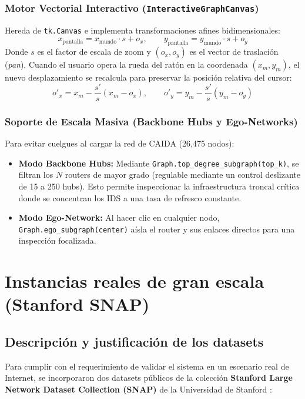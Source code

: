 \documentclass[11pt,a4paper]{article}
\begin{document}
\subsubsection{Motor Vectorial Interactivo (\texttt{InteractiveGraphCanvas})}
Hereda de \texttt{tk.Canvas} e implementa transformaciones afines bidimensionales:
\begin{equation}
	x_{\text{pantalla}} = x_{\text{mundo}} \cdot s + o_x, \qquad y_{\text{pantalla}} = y_{\text{mundo}} \cdot s + o_y
\end{equation}
Donde $s$ es el factor de escala de zoom y $(o_x, o_y)$ es el vector de traslación (\textit{pan}). Cuando el usuario opera la rueda del ratón en la coordenada $(x_m, y_m)$, el nuevo desplazamiento se recalcula para preservar la posición relativa del cursor:
\begin{equation}
	o'_x = x_m - \frac{s'}{s} (x_m - o_x), \qquad o'_y = y_m - \frac{s'}{s} (y_m - o_y)
\end{equation}

\subsubsection{Soporte de Escala Masiva (Backbone Hubs y Ego-Networks)}
Para evitar cuelgues al cargar la red de CAIDA (26,475 nodos):
\begin{itemize}[itemsep=1pt]
	\item \textbf{Modo Backbone Hubs:} Mediante \texttt{Graph.top\_degree\_subgraph(top\_k)}, se filtran los $N$ routers de mayor grado (regulable mediante un control deslizante de 15 a 250 hubs). Esto permite inspeccionar la infraestructura troncal crítica donde se concentran los IDS a una tasa de refresco constante.
	\item \textbf{Modo Ego-Network:} Al hacer clic en cualquier nodo, \texttt{Graph.ego\_subgraph(center)} aísla el router y sus enlaces directos para una inspección focalizada.
\end{itemize}

\section{Instancias reales de gran escala (Stanford SNAP)}
\label{sec:instancias-reales}

\subsection{Descripción y justificación de los datasets}
Para cumplir con el requerimiento de validar el sistema en un escenario real de Internet, se incorporaron dos datasets públicos de la colección \textbf{Stanford Large Network Dataset Collection (SNAP)} de la Universidad de Stanford \cite{snap-as733, snap-caida}:
\end{document}
